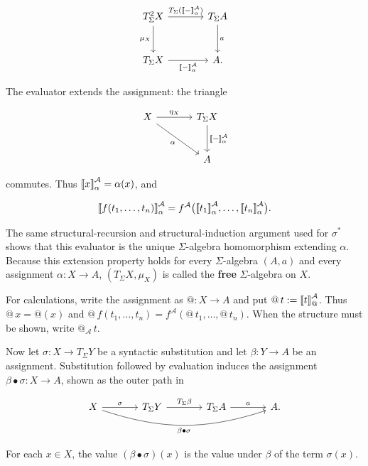 \documentclass[11pt]{article}
\makeatletter
\newcommand{\llbracket}{\mathopen{[\mkern-3mu[}}
\newcommand{\rrbracket}{\mathclose{]\mkern-3mu]}}
\newcommand{\atsign}{\mathord{@}}
\theoremstyle{definition}
\makeatother
\begin{document}
\[
\begin{tikzcd}[row sep=large,column sep=large]
T_\Sigma^2X
  \arrow[r,"T_\Sigma(\llbracket-\rrbracket^{\mathcal A}_\alpha)"]
  \arrow[d,"\mu_X"'] &
T_\Sigma A \arrow[d,"a"] \\
T_\Sigma X
  \arrow[r,"\llbracket-\rrbracket^{\mathcal A}_\alpha"'] & A.
\end{tikzcd}
\]

The evaluator extends the assignment: the triangle

\[
\begin{tikzcd}[row sep=large,column sep=large]
X \arrow[r,"\eta_X"] \arrow[dr,"\alpha"'] &
T_\Sigma X \arrow[d,"\llbracket-\rrbracket^{\mathcal A}_\alpha"] \\
& A
\end{tikzcd}
\]

commutes. Thus \(\llbracket x\rrbracket^{\mathcal A}_\alpha=\alpha(x)\), and

\[
\llbracket f(t_1,\ldots,t_n)\rrbracket^{\mathcal A}_\alpha
=
f^{\mathcal A}
\bigl(
\llbracket t_1\rrbracket^{\mathcal A}_\alpha,
\ldots,
\llbracket t_n\rrbracket^{\mathcal A}_\alpha
\bigr).
\]

The same structural-recursion and structural-induction argument used for
\(\sigma^*\) shows that this evaluator is the unique
\(\Sigma\)-algebra homomorphism extending \(\alpha\).
Because this extension property holds for every \(\Sigma\)-algebra
\((A,a)\) and every assignment \(\alpha:X\to A\),
\((T_\Sigma X,\mu_X)\) is called the \textbf{free} \(\Sigma\)-algebra on
\(X\).

For calculations, write the assignment as \(\atsign:X\to A\) and put
\(\atsign\,t:=\llbracket t\rrbracket^{\mathcal A}_{\atsign}\). Thus
\(\atsign\,x=\atsign(x)\) and
\(\atsign\,f(t_1,\ldots,t_n)=
f^{\mathcal A}(\atsign\,t_1,\ldots,\atsign\,t_n)\). When the structure must
be shown, write \(\atsign_{\mathcal A}\,t\).

Now let \(\sigma:X\to T_\Sigma Y\) be a syntactic substitution and let
\(\beta:Y\to A\) be an assignment. Substitution followed by evaluation
induces the assignment \(\beta\bullet\sigma:X\to A\), shown as the outer
path in

\[
\begin{tikzcd}[column sep=large]
X \arrow[r,"\sigma"]
  \arrow[rrr,bend right=18,"\beta\mathbin\bullet\sigma"'] &
T_\Sigma Y \arrow[r,"T_\Sigma\beta"] &
T_\Sigma A \arrow[r,"a"] & A.
\end{tikzcd}
\]

For each \(x\in X\), the value \((\beta\bullet\sigma)(x)\) is the value
under \(\beta\) of the term \(\sigma(x)\).
\end{document}
